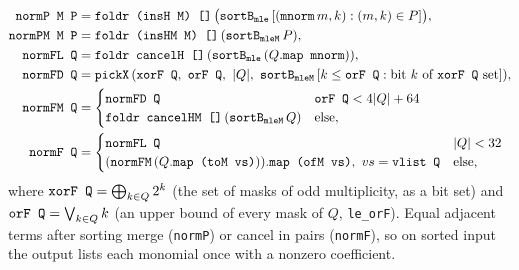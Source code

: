 \begin{definition}\label{def:lean-pathsum-norm}
\begin{align*}
\textnormal{\texttt{normP M P}} &= \textnormal{\texttt{foldr (\allowbreak{}insH M) []}}\,\bigl(\textnormal{\texttt{sortB}}_{\textnormal{\texttt{mle}}}\,[(\textnormal{\texttt{mnorm}}\,m, k) : (m,k)\in P]\bigr),\\
\textnormal{\texttt{normPM M P}} &= \textnormal{\texttt{foldr (\allowbreak{}insHM M) []}}\,(\textnormal{\texttt{sortB}}_{\textnormal{\texttt{mleM}}}\,P),\\
\textnormal{\texttt{normFL Q}} &= \textnormal{\texttt{foldr cancelH []}}\,(\textnormal{\texttt{sortB}}_{\textnormal{\texttt{mle}}}\,(Q.\textnormal{\texttt{map mnorm}})),\\
\textnormal{\texttt{normFD Q}} &= \textnormal{\texttt{pickX}}\,(\textnormal{\texttt{xorF Q}},\ \textnormal{\texttt{orF Q}},\ |Q|,\ \textnormal{\texttt{sortB}}_{\textnormal{\texttt{mleM}}}\,[k\le\textnormal{\texttt{orF Q}} : \text{bit } k \text{ of } \textnormal{\texttt{xorF Q}} \text{ set}]),\\
\textnormal{\texttt{normFM Q}} &= \begin{cases}\textnormal{\texttt{normFD Q}} & \textnormal{\texttt{orF Q}} < 4|Q|+64\\
   \textnormal{\texttt{foldr cancelHM []}}\,(\textnormal{\texttt{sortB}}_{\textnormal{\texttt{mleM}}}\,Q) & \text{else,}\end{cases}\\
\textnormal{\texttt{normF Q}} &= \begin{cases}\textnormal{\texttt{normFL Q}} & |Q|<32\\
   (\textnormal{\texttt{normFM}}\,(Q.\textnormal{\texttt{map (\allowbreak{}toM vs)}})).\textnormal{\texttt{map (\allowbreak{}ofM vs)}},\ vs = \textnormal{\texttt{vlist Q}} & \text{else,}\end{cases}
\end{align*}
where $\textnormal{\texttt{xorF Q}} = \bigoplus_{k\in Q} 2^k$ (the set of masks of odd multiplicity, as a bit
set) and $\textnormal{\texttt{orF Q}} = \bigvee_{k\in Q} k$ (an upper bound of every mask of $Q$, \textnormal{\texttt{le\_\allowbreak{}orF}}).
Equal adjacent terms after sorting merge (\textnormal{\texttt{normP}}) or cancel in pairs (\textnormal{\texttt{normF}}), so on
sorted input the output lists each monomial once with a nonzero coefficient.
\end{definition}

